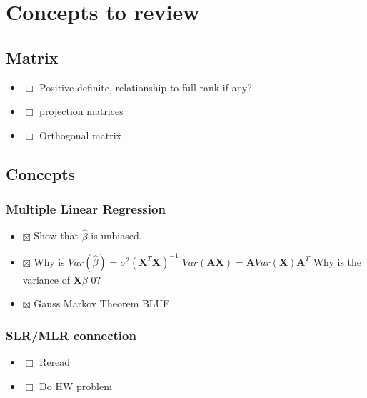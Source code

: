 \documentclass[11pt]{article}
\begin{document}
\section{Concepts to review}
\label{sec-2}
\subsection{Matrix}
\label{sec-2-1}

\begin{itemize}
\item $\Box$ Positive definite, relationship to full rank if any?
\item $\Box$ projection matrices
\item $\Box$ Orthogonal matrix
\end{itemize}
\subsection{Concepts}
\label{sec-2-2}
\subsubsection{Multiple Linear Regression}
\label{sec-2-2-1}

\begin{itemize}
\item $\boxtimes$ Show that $\hat{\beta}$ is unbiased.
\item $\boxtimes$ Why is $Var(\hat{\beta}) = \sigma^2 (\mathbf{X}^T\mathbf{X})^{-1}$
    $Var(\mathbf{A}\mathbf{X}) = \mathbf{A} Var(\mathbf{X})
  \mathbf{A}^{T}$
    Why is the variance of \textbf{X$\beta$} 0?
\item $\boxtimes$ Gauss Markov Theorem
    BLUE
\end{itemize}
\subsubsection{SLR/MLR connection}
\label{sec-2-2-2}

\begin{itemize}
\item $\Box$ Reread
\item $\Box$ Do HW problem
\end{itemize}
\end{document}
